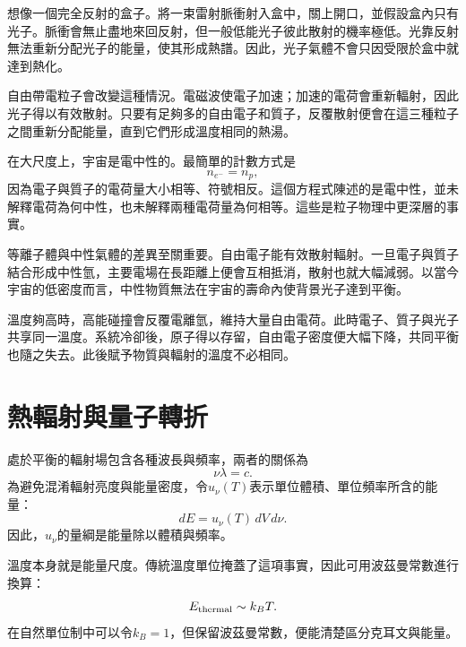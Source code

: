 想像一個完全反射的盒子。將一束雷射脈衝射入盒中，關上開口，並假設盒內只有光子。脈衝會無止盡地來回反射，但一般低能光子彼此散射的機率極低。光靠反射無法重新分配光子的能量，使其形成熱譜。因此，光子氣體不會只因受限於盒中就達到熱化。

自由帶電粒子會改變這種情況。電磁波使電子加速；加速的電荷會重新輻射，因此光子得以有效散射。只要有足夠多的自由電子和質子，反覆散射便會在這三種粒子之間重新分配能量，直到它們形成溫度相同的熱湯。

在大尺度上，宇宙是電中性的。最簡單的計數方式是
\begin{equation}
n_{e^-}=n_p,
\label{eq:c07-neutrality}
\end{equation}
因為電子與質子的電荷量大小相等、符號相反。這個方程式陳述的是電中性，並未解釋電荷為何中性，也未解釋兩種電荷量為何相等。這些是粒子物理中更深層的事實。

等離子體與中性氣體的差異至關重要。自由電子能有效散射輻射。一旦電子與質子結合形成中性氫，主要電場在長距離上便會互相抵消，散射也就大幅減弱。以當今宇宙的低密度而言，中性物質無法在宇宙的壽命內使背景光子達到平衡。

溫度夠高時，高能碰撞會反覆電離氫，維持大量自由電荷。此時電子、質子與光子共享同一溫度。系統冷卻後，原子得以存留，自由電子密度便大幅下降，共同平衡也隨之失去。此後賦予物質與輻射的溫度不必相同。

\begin{classroomqa}
\end{classroomqa}

\section{熱輻射與量子轉折}

處於平衡的輻射場包含各種波長與頻率，兩者的關係為
\begin{equation}
\nu\lambda=c.
\end{equation}
為避免混淆輻射亮度與能量密度，令\(u_\nu(T)\)表示單位體積、單位頻率所含的能量：
\begin{equation}
dE=u_\nu(T)\,dV\,d\nu.
\label{eq:c07-spectral-density}
\end{equation}
因此，\(u_\nu\)的量綱是能量除以體積與頻率。

溫度本身就是能量尺度。傳統溫度單位掩蓋了這項事實，因此可用波茲曼常數進行換算：
\begin{equation}
E_{\rm thermal}\sim k_B T.
\end{equation}
在自然單位制中可以令\(k_B=1\)，但保留波茲曼常數，便能清楚區分克耳文與能量。

